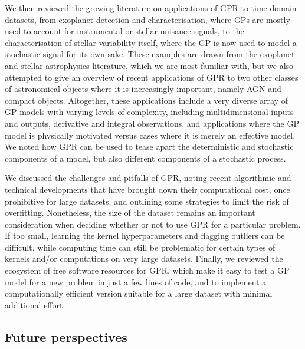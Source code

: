 \documentclass[letterpaper]{ar-1col}
\begin{document}
We then reviewed the growing literature on applications of GPR to time-domain datasets, from exoplanet detection and characterisation, where GPs are mostly used to account for instrumental or stellar nuisance signals, to the characterisation of stellar variability itself, where the GP is now used to model a stochastic signal for its own sake. These examples are drawn from the exoplanet and stellar astrophysics literature, which we are most familiar with, but we also attempted to give an overview of recent applications of GPR to two other classes of astronomical objects where it is increasingly important, namely AGN and compact objects. Altogether, these applications include a very diverse array of GP models with varying levels of complexity, including multidimensional inputs and outputs, derivative and integral observations, and applications where the GP model is physically motivated versus cases where it is merely an effective model. We noted how GPR can be used to tease apart the deterministic and stochastic components of a model, but also different components of a stochastic process. 

We discussed the challenges and pitfalls of GPR, noting recent algorithmic and technical developments that have brought down their computational cost, once prohibitive for large datasets, and outlining some strategies to limit the risk of overfitting. Nonetheless, the size of the dataset remains an important consideration when deciding whether or not to use GPR for a particular problem. If too small, learning the kernel hyperparameters and flagging outliers can be difficult, while computing time can still be problematic for certain types of kernels and/or computations on very large datasets. Finally, we reviewed the ecosystem of free software resources for GPR, which make it easy to test a GP model for a new problem in just a few lines of code, and to implement a computationally efficient version suitable for a large dataset with minimal additional effort. 

\subsection{Future perspectives}
\end{document}
